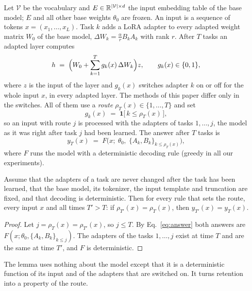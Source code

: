 Let $\mathcal{V}$ be the vocabulary and $E \in \mathbb{R}^{|\mathcal{V}| \times d}$ the input embedding
table of the base model; $E$ and all other base weights $\theta_0$ are frozen. An input is a
sequence of tokens $x = (x_1, \dots, x_L)$. Task $k$ adds a LoRA adapter \citep{hu2022lora} to every adapted weight matrix $W_0$ of the base
model, $\Delta W_k = \tfrac{\alpha}{r} B_k A_k$ with rank $r$. After $T$ tasks an adapted layer
computes
\begin{equation}
  h \;=\; \Bigl( W_0 + \sum_{k=1}^{T} g_k(x)\, \Delta W_k \Bigr) z ,
  \qquad g_k(x) \in \{0, 1\},
  \label{eq:layer}
\end{equation}
where $z$ is the input of the layer and $g_k(x)$ switches adapter $k$ on or off for the whole input
$x$, in every adapted layer. The methods of this paper differ only in the switches. All of
them use a \emph{route} $\rho_T(x) \in \{1, \dots, T\}$ and set
\begin{equation}
  g_k(x) \;=\; \mathbf{1}\bigl[\, k \le \rho_T(x) \,\bigr] ,
  \label{eq:gates}
\end{equation}
so an input with route $j$ is processed with the adapters of tasks $1, \dots, j$,
the model as it was right after task $j$ had been learned. The answer after $T$ tasks is
\begin{equation}
  y_T(x) \;=\; F\bigl(x;\; \theta_0,\; \{A_k, B_k\}_{k \le \rho_T(x)}\bigr),
  \label{eq:answer}
\end{equation}
where $F$ runs the model with a deterministic decoding rule (greedy in all our experiments).

\begin{lemma}
\label{lem:route}
Assume that the adapters of a task are never changed after the task has been learned, that the
base model, its tokenizer, the input template and truncation are fixed, and that decoding is
deterministic. Then for every rule that sets the route, every input $x$ and all times $T' > T$:
if $\rho_{T'}(x) = \rho_T(x)$, then $y_{T'}(x) = y_T(x)$.
\end{lemma}

\begin{proof}
Let $j = \rho_T(x) = \rho_{T'}(x)$, so $j \le T$. By Eq.~\eqref{eq:answer} both answers are
$F(x; \theta_0, \{A_k, B_k\}_{k \le j})$. The adapters of the tasks $1, \dots, j$ exist at time $T$
and are the same at time $T'$, and $F$ is deterministic.
\end{proof}

The lemma uses nothing about the model except that it is a deterministic function of its input and
of the adapters that are switched on. It turns retention into a property of the route.

